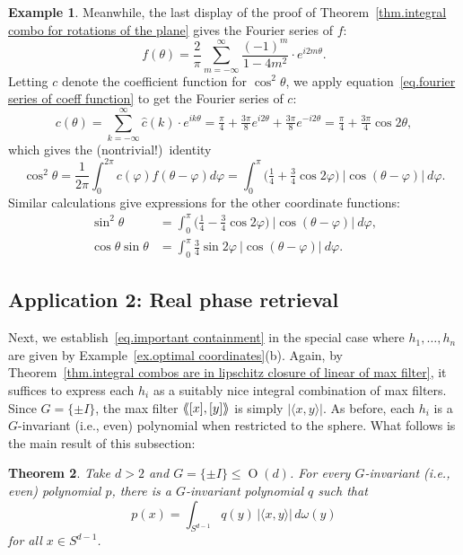 \documentclass{article}
\theoremstyle{plain}
\newtheorem{theorem}{Theorem}
\theoremstyle{definition}
\newtheorem{example}[theorem]{Example}
\newcommand{\llangle}{\langle\hspace{-2.5pt}\langle}
\newcommand{\rrangle}{\rangle\hspace{-2.5pt}\rangle}
\begin{document}
\begin{example}
Meanwhile, the last display of the proof of Theorem~\ref{thm.integral combo for rotations of the plane} gives the Fourier series of $f$:
\[
f(\theta)
=\frac{2}{\pi}\sum_{m=-\infty}^\infty\frac{(-1)^{m}}{1-4m^2}\cdot e^{i2m\theta}.
\]
Letting $c$ denote the coefficient function for $\cos^2\theta$, we apply equation~\eqref{eq.fourier series of coeff function} to get the Fourier series of $c$:
\[
c(\theta)
= \sum_{k=-\infty}^\infty \hat{c}(k)\cdot e^{ik\theta}
= \tfrac{\pi}{4}+\tfrac{3\pi}{8}e^{i2\theta}+\tfrac{3\pi}{8}e^{-i2\theta}
= \tfrac{\pi}{4}+\tfrac{3\pi}{4}\cos2\theta,
\]
which gives the (nontrivial!)\ identity
\[
\cos^2\theta
=\frac{1}{2\pi}\int_0^{2\pi}c(\varphi)f(\theta-\varphi)d\varphi
=\int_0^{\pi}\Big(\tfrac{1}{4}+\tfrac{3}{4}\cos2\varphi\Big)~|\cos(\theta-\varphi)|~d\varphi.
\]
Similar calculations give expressions for the other coordinate functions:
\begin{align*}
\sin^2\theta
&=\int_0^{\pi}\Big(\tfrac{1}{4}-\tfrac{3}{4}\cos2\varphi\Big)~|\cos(\theta-\varphi)|~d\varphi,\\
\cos\theta\sin\theta
&=\int_0^{\pi}\tfrac{3}{4}\sin2\varphi~|\cos(\theta-\varphi)|~d\varphi.
\end{align*}
\end{example}

\subsection{Application 2: Real phase retrieval}
\label{subsec:real phase retrieval}

Next, we establish~\eqref{eq.important containment} in the special case where $h_1,\ldots,h_n$ are given by Example~\ref{ex.optimal coordinates}(b).
Again, by Theorem~\ref{thm.integral combos are in lipschitz closure of linear of max filter}, it suffices to express each $h_i$ as a suitably nice integral combination of max filters.
Since $G=\{\pm I\}$, the max filter $\llangle [x],[y]\rrangle$ is simply $|\langle x,y\rangle|$.
As before, each $h_i$ is a $G$-invariant (i.e., even) polynomial when restricted to the sphere.
What follows is the main result of this subsection:

\begin{theorem}
\label{thm.integral of max filters for pmI invariant polynomials}
Take $d>2$ and $G=\{\pm I\}\leq \operatorname{O}(d)$.
For every $G$-invariant (i.e., even) polynomial $p$, there is a $G$-invariant polynomial $q$ such that
\[
p(x)
=\int_{S^{d-1}} q(y) \, |\langle x,y\rangle| \, d\omega(y)
\]
for all $x\in S^{d-1}$.
\end{theorem}
\end{document}
